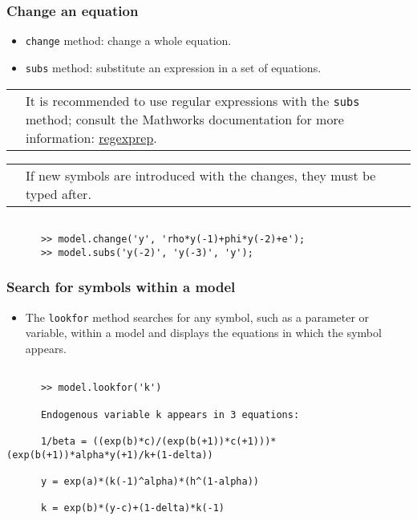 \documentclass[10pt,slidestop]{beamer}
\makeatletter
\theoremstyle{plain}
\newcommand{\dnote}[1]{%
    \noindent %
    \begin{tabular}{@{}m{0.13\textwidth}@{}m{0.87\textwidth}@{}}%
        \huge\textdbend &#1%
    \end{tabular}%
    \par %
}
\makeatother
\begin{document}
\begin{frame}[c,fragile]
  \frametitle{Change an equation}

  \begin{itemize}
  \item \verb+change+ method: change a whole equation.\newline
  \item \verb+subs+ method: substitute an expression in a set of equations.\newline
  \end{itemize}

    \medskip

    \dnote{It is recommended to use regular expressions with the \texttt{subs} method; consult the Mathworks documentation for more information: \href{https://fr.mathworks.com/help/matlab/ref/regexprep.html}{regexprep}.}

    \bigskip

    \dnote{If new symbols are introduced with the changes, they must be typed after.}

    \bigskip

    \begin{lstlisting}[style=MatlabConsole]

      >> model.change('y', 'rho*y(-1)+phi*y(-2)+e');
      >> model.subs('y(-2)', 'y(-3)', 'y');
  \end{lstlisting}

\end{frame}


\begin{frame}[c,fragile]
  \frametitle{Search for symbols within a model}

  \begin{itemize}

  \item The \verb+lookfor+ method searches for any symbol, such as a parameter or variable, within a model and displays the equations in which the symbol appears.\newline

  \end{itemize}

    \medskip

    \begin{lstlisting}[style=MatlabConsole]

      >> model.lookfor('k')

      Endogenous variable k appears in 3 equations:

      1/beta = ((exp(b)*c)/(exp(b(+1))*c(+1)))*(exp(b(+1))*alpha*y(+1)/k+(1-delta))

      y = exp(a)*(k(-1)^alpha)*(h^(1-alpha))

      k = exp(b)*(y-c)+(1-delta)*k(-1)
  \end{lstlisting}

\end{frame}
\end{document}
